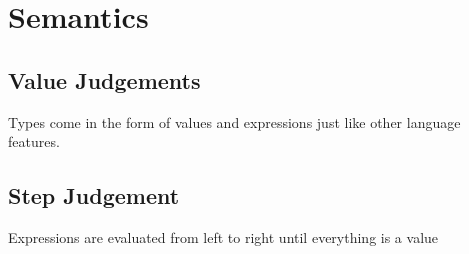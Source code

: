 \documentclass{article}
\begin{document}
\section{Semantics}

\subsection{Value Judgements}
Types come in the form of values and expressions just like other language features.
{
    \centering
    \def \MathparLineskip {\lineskip=0.43cm}
}

\subsection{Step Judgement}
Expressions are evaluated from left to right until everything is a value
{
    \centering
    \def \MathparLineskip {\lineskip=0.43cm}
}
\end{document}
